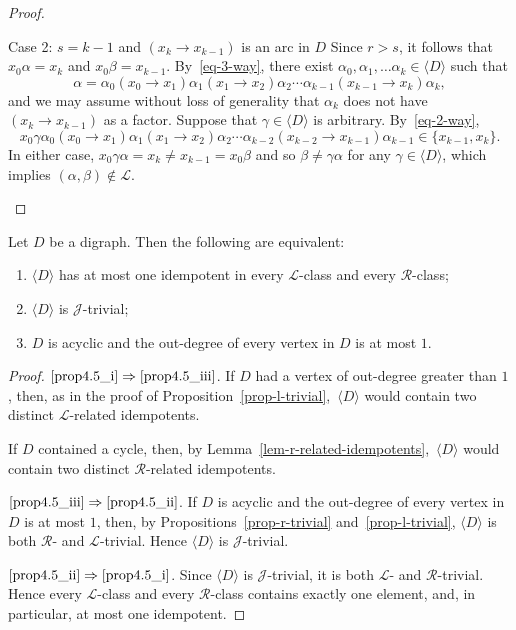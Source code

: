 \documentclass[ALCO,ThmDefs,Unicode,epreuves]{cedram}
\newcommand{\genset}[1]{\langle#1\rangle}
\newcommand{\LL}{\mathcal{L}}
\newcommand{\R}{\mathcal{R}}
\newcommand{\J}{\mathcal{J}}
\newcommand{\easty}[2]{(#1 \to #2)}
\begin{document}
\begin{proof}
\begin{enonce*}[remark]{Case 2: ${s = k - 1}$ and ${(x_{k} \to
 x_{k-1})}$ is an arc in ${D}$} 
 Since $r > s$, it follows that $x_0\alpha=x_k$
 and $x_0\beta=x_{k-1}$. By~\eqref{eq-3-way}, there exist $\alpha_0,
 \alpha_1, \ldots \alpha_k\in \genset{D}$ such that 
 \[ \alpha= \alpha_0\easty{x_0}{x_1}\alpha_1\easty{x_1}{x_2}\alpha_2\cdots
 \alpha_{k-1}\easty{x_{k-1}}{x_k}\alpha_k,\]
 and we may assume without loss of generality that $\alpha_k$ does not have
 $(x_{k} \to x_{k -1})$ as a factor. Suppose that $\gamma\in
 \genset{D}$ is arbitrary. By~\eqref{eq-2-way}, 
 \[x_0\gamma \alpha_0\easty{x_0}{x_1}\alpha_1\easty{x_1}{x_2}\alpha_2\cdots
 \alpha_{k-2}\easty{x_{k-2}}{x_{k-1}}\alpha_{k-1} \in \{x_{k - 1}, x_k\}.\]
 In either case, $x_0\gamma \alpha = x_k \not = x_{k-1} = x_0\beta$ and so 
 $\beta\not=\gamma\alpha$ for any $\gamma\in\genset{D}$, which implies
 $(\alpha,\beta)\not\in\LL$.\qedhere
 \end{enonce*}
\end{proof}

\begin{proposition}\label{prop-j-trivial}
 Let $D$ be a digraph. Then the following are equivalent:
 \begin{enumerate}[(\roman*)]

 \item\label{prop4.5_i}
 $\genset{D}$ has at most one idempotent in every $\LL$-class and every
 $\R$-class;

 \item\label{prop4.5_ii}
 $\genset{D}$ is $\J$-trivial;

 \item\label{prop4.5_iii}
 $D$ is acyclic and the out-degree of every vertex in $D$ is at most
 $1$.
 \end{enumerate}
\end{proposition}
\begin{proof}
$\ref{prop4.5_i}\Rightarrow\ref{prop4.5_iii}$.
 If $D$ had a vertex of out-degree greater than $1$, then, as in the proof of
 Proposition~\ref{prop-l-trivial},~$\genset{D}$ would contain two distinct
 $\LL$-related idempotents.

 If $D$ contained a cycle, then, by
 Lemma~\ref{lem-r-related-idempotents},~$\genset{D}$ would contain two
 distinct $\R$-related idempotents.

$\ref{prop4.5_iii}\Rightarrow\ref{prop4.5_ii}$. 
 If $D$ is acyclic and the out-degree of every vertex in $D$ is at most
 $1$, then, by Propositions~\ref{prop-r-trivial}
 and~\ref{prop-l-trivial}, $\genset{D}$ is both $\R$- and $\LL$-trivial. 
 Hence $\genset{D}$ is $\J$-trivial.

$\ref{prop4.5_ii}\Rightarrow\ref{prop4.5_i}$.
 Since $\genset{D}$ is $\J$-trivial, it is both $\LL$- and $\R$-trivial. Hence
 every $\LL$-class and every $\R$-class contains exactly one element, and, in
 particular, at most one idempotent.
\end{proof}
\end{document}
